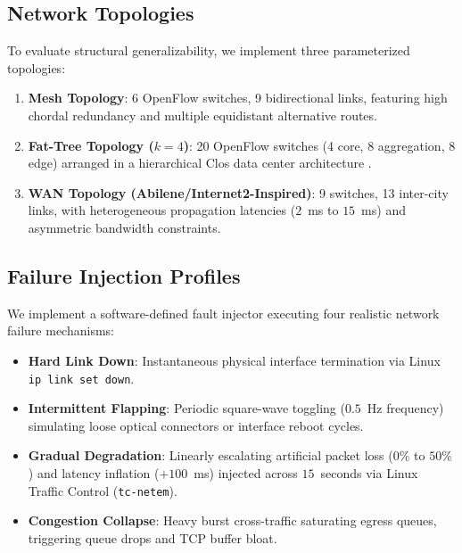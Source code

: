 \documentclass[journal,10pt,twocolumn]{IEEEtran}
\begin{document}
\subsection{Network Topologies}
To evaluate structural generalizability, we implement three parameterized topologies:
\begin{enumerate}
    \item \textbf{Mesh Topology}: 6 OpenFlow switches, 9 bidirectional links, featuring high chordal redundancy and multiple equidistant alternative routes.
    \item \textbf{Fat-Tree Topology ($k=4$)}: 20 OpenFlow switches (4 core, 8 aggregation, 8 edge) arranged in a hierarchical Clos data center architecture \cite{alfares2008fattree}.
    \item \textbf{WAN Topology (Abilene/Internet2-Inspired)}: 9 switches, 13 inter-city links, with heterogeneous propagation latencies ($2$~ms to $15$~ms) and asymmetric bandwidth constraints.
\end{enumerate}

\subsection{Failure Injection Profiles}
We implement a software-defined fault injector executing four realistic network failure mechanisms:
\begin{itemize}
    \item \textbf{Hard Link Down}: Instantaneous physical interface termination via Linux \texttt{ip link set down}.
    \item \textbf{Intermittent Flapping}: Periodic square-wave toggling ($0.5$~Hz frequency) simulating loose optical connectors or interface reboot cycles.
    \item \textbf{Gradual Degradation}: Linearly escalating artificial packet loss ($0\%$ to $50\%$) and latency inflation ($+100$~ms) injected across $15$~seconds via Linux Traffic Control (\texttt{tc-netem}).
    \item \textbf{Congestion Collapse}: Heavy burst cross-traffic saturating egress queues, triggering queue drops and TCP buffer bloat.
\end{itemize}
\end{document}
